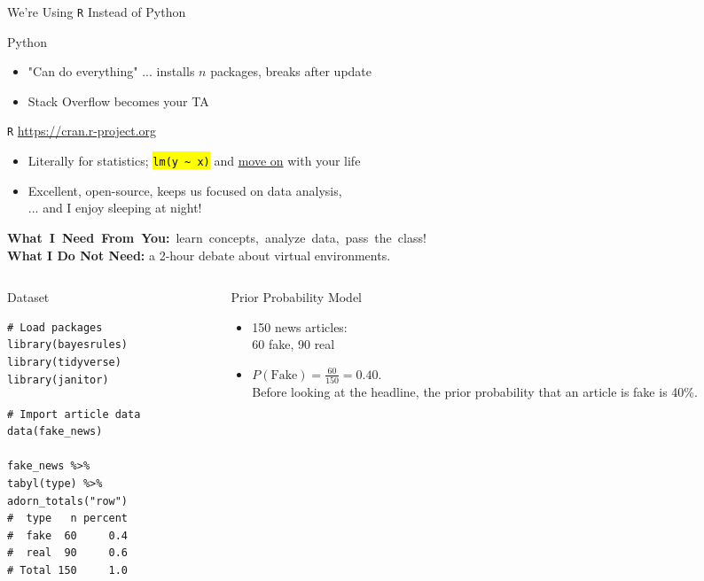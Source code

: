 \documentclass[12pt]{beamer}
\begin{document}
{
\begin{frame}{We’re Using \texttt{R} Instead of Python}
\begin{block}{Python}
\begin{itemize}
\item "Can do everything" ... installs $n$ packages, breaks after update
\item Stack Overflow becomes your TA
\end{itemize}
\end{block}
\begin{block}{\texttt{R} \quad \rightarrow \quad \url{https://cran.r-project.org}}
\begin{itemize}
\item Literally for statistics; \hl{\texttt{lm(y \textasciitilde{} x)}} and \ul{move on} with your life
\item Excellent, open-source, keeps us focused on data analysis,\\... and I enjoy sleeping at night!
\end{itemize}
\end{block}
\mbox{\textbf{What I Need From You:} learn concepts, analyze data, pass the class!}\\
\textbf{What I Do Not Need:} a 2-hour debate about virtual environments.
\end{frame}
}

\begin{frame}[fragile]{}

\begin{columns}[t]
\begin{column}{0.285\textwidth}
\begin{block}{Dataset}
\begin{verbatim}
# Load packages
library(bayesrules)
library(tidyverse)
library(janitor)

# Import article data
data(fake_news)

fake_news %>% 
tabyl(type) %>% 
adorn_totals("row")
#  type   n percent
#  fake  60     0.4
#  real  90     0.6
# Total 150     1.0
\end{verbatim}
\end{block}
\end{column}

\begin{column}{0.53\textwidth}
\begin{block}{Prior Probability Model}
\begin{itemize}
\item 150 news articles:\\60 fake, 90 real
\item $P(\text{Fake}) = \frac{60}{150} = 0.40$.\\
  Before looking at the headline, the prior probability that an article is fake is 40\%.
\end{itemize}
\end{block}
\end{column}
\end{columns}
\end{frame}
\end{document}
